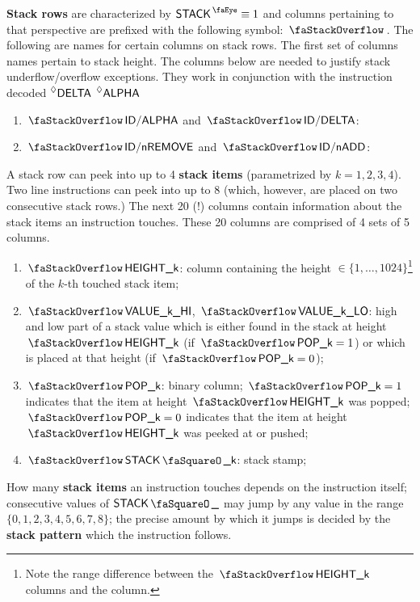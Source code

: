 \begin{center}
\end{center}
\textbf{Stack rows}\label{def: stack row} are characterized by $\peekStack \equiv 1$ and columns pertaining to that perspective are prefixed with the following symbol: $\stackSignifier$.
The following are names for certain columns on stack rows. The first set of columns names pertain to stack height.
The columns below are needed to justify stack underflow/overflow exceptions. They work in conjunction with the instruction decoded $\prescript{\lozenge}{}{\textsf{DELTA}}$ $\prescript{\lozenge}{}{\textsf{ALPHA}}$
\begin{enumerate}[resume]
	\item $\stackAlpha$    and $\stackDelta$:
	\item $\stackNbRemove$ and $\stackNbAdd$:
\end{enumerate}
A stack row can peek into up to 4 \textbf{stack items} (parametrized by $k=1,2,3,4$). Two line instructions can peek into up to 8 (which, however, are placed on two consecutive stack rows.)
The next 20 (!) columns contain information about the stack items an instruction touches.
These 20 columns are comprised of 4 sets of 5 columns.
\begin{enumerate}[resume]
	\item $\stackItemHeight{k}$:
		column containing the height $\in\{1,\dots,1024\}$\footnote{Note the range difference between the $\stackItemHeight{k}$ columns and the \stackHeight{} column.} of the $k$-th touched stack item;
	\item $\stackItemValHi{k}$, $\stackItemValLo{k}$:
		high and low part of a stack value which is either found in the stack at height $\stackItemHeight{k}$ (if $\stackItemPop{k} = 1$) or which is placed at that height (if $\stackItemPop{k} = 0$);
	\item $\stackItemPop{k}$:
		binary column; $\stackItemPop{k} = 1$ indicates that the item at height $\stackItemHeight{k}$ was popped; $\stackItemPop{k} = 0$ indicates that the item at height $\stackItemHeight{k}$ was peeked at or pushed; 
	\item $\stackItemStamp{k}$:
		stack stamp;
\end{enumerate}
How many \textbf{stack items} an instruction touches depends on the instruction itself; consecutive values of $\sStamp{}$ may jump by any value in the range $\{0,1,2,3,4,5,6,7,8\}$; the precise amount by which it jumps is decided by the \textbf{stack pattern} which the instruction follows.
